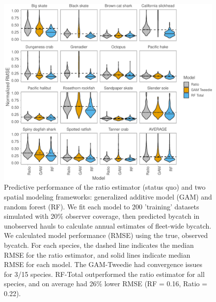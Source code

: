 \documentclass[]{article}
\begin{document}
\begin{figure}

{\centering \includegraphics{bycatch_sim_paper_sepsupp_appliedecology_files/figure-latex/model-comparison-1} 

}

\caption{Predictive performance of the ratio estimator (status quo) and two spatial modeling frameworks: generalized additive model (GAM) and random forest (RF). We fit each model to 200 'training' datasets simulated with 20\% observer coverage, then predicted bycatch in unobserved hauls to calculate annual estimates of fleet-wide bycatch. We calculated model performance (RMSE) using the true, observed bycatch. For each species, the dashed line indicates the median RMSE for the ratio estimator, and solid lines indicate median RMSE for each model. The GAM-Tweedie had convergence issues for 3/15 species. RF-Total outperformed the ratio estimator for all species, and on average had 26\% lower RMSE (RF = 0.16, Ratio = 0.22).}\label{fig:model-comparison}
\end{figure}

\pagebreak
\end{document}
